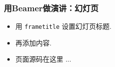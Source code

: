 \begin{CJK*}{UTF8}{gbsn}
\begin{frame}
  \frametitle{用Beamer做演讲：幻灯页}
  \begin{itemize}
    \item 用 \texttt{frametitle} 设置幻灯页标题.
    \item 再添加内容.
    \item 页面源码在这里 ... 
  \end{itemize}
\end{frame}
\clearpage\end{CJK*}
